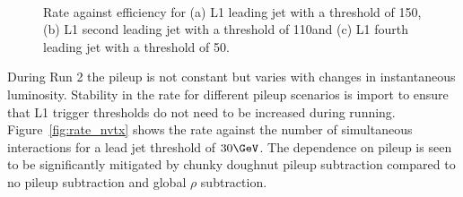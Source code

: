 \begin{figure}[h!]
  \centering
    ~
    \\
  \caption{\label{fig:rate_eff_jets} Rate against efficiency for (a) L1 leading jet with a threshold of 150\GeV, 
  (b) L1 second leading jet with a threshold of 110\GeV and (c) L1 fourth leading jet with a threshold of 50\GeV.}
\end{figure}

During Run 2 the pileup is not constant but varies with changes in instantaneous luminosity. 
Stability in the rate for different pileup scenarios is import to ensure that L1 trigger thresholds 
do not need to be increased during running. Figure~\ref{fig:rate_nvtx} shows the rate against the number of 
simultaneous interactions for a lead jet threshold of $30\GeV$. The dependence on pileup is 
seen to be significantly mitigated by chunky doughnut pileup subtraction compared to no pileup subtraction and global $\rho$
subtraction. 

